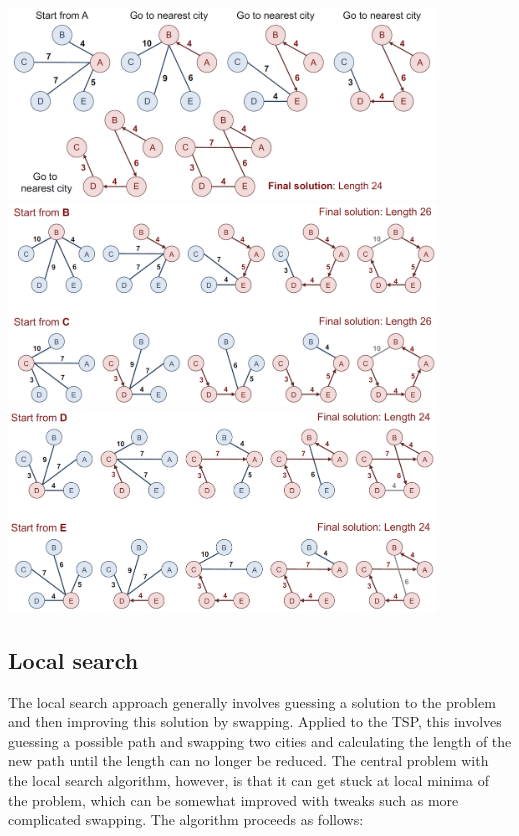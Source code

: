 \begin{center}\includegraphics[width=0.85\textwidth]{img/approximation/TspGreedy1.png}\\\includegraphics[width=0.85\textwidth]{img/approximation/TspGreedy2.png}\\\includegraphics[width=0.85\textwidth]{img/approximation/TspGreedy3.png}\end{center}

%

\subsection{Local search}

The local search approach generally involves guessing a solution to the problem and then improving this solution by swapping. Applied to the TSP, this involves guessing a possible path and swapping two cities and calculating the length of the new path until the length can no longer be reduced. The central problem with the local search algorithm, however, is that it can get stuck at local minima of the problem, which can be somewhat improved with tweaks such as more complicated swapping. The algorithm proceeds as follows:


